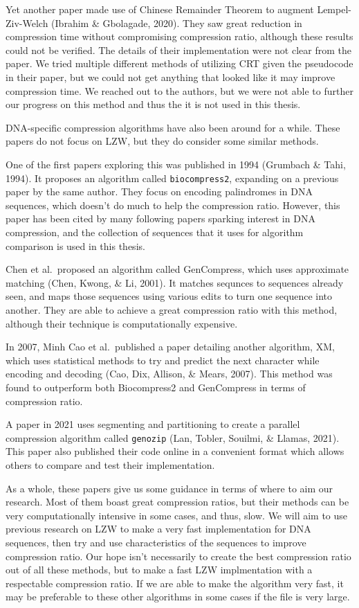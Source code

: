 \documentclass[12pt,twoside]{reedthesis}
\begin{document}
Yet another paper made use of Chinese Remainder Theorem to augment Lempel-Ziv-Welch (Ibrahim \& Gbolagade, 2020). They saw great reduction in compression time without compromising compression ratio, although these results could not be verified. The details of their implementation were not clear from the paper. We tried multiple different methods of utilizing CRT given the pseudocode in their paper, but we could not get anything that looked like it may improve compression time. We reached out to the authors, but we were not able to further our progress on this method and thus the it is not used in this thesis.

DNA-specific compression algorithms have also been around for a while. These papers do not focus on LZW, but they do consider some similar methods.

One of the first papers exploring this was published in 1994 (Grumbach \& Tahi, 1994). It proposes an algorithm called \texttt{biocompress2}, expanding on a previous paper by the same author. They focus on encoding palindromes in DNA sequences, which doesn't do much to help the compression ratio. However, this paper has been cited by many following papers sparking interest in DNA compression, and the collection of sequences that it uses for algorithm comparison is used in this thesis.

Chen et al.~proposed an algorithm called GenCompress, which uses approximate matching (Chen, Kwong, \& Li, 2001). It matches sequnces to sequences already seen, and maps those sequences using various edits to turn one sequence into another. They are able to achieve a great compression ratio with this method, although their technique is computationally expensive.

In 2007, Minh Cao et al.~published a paper detailing another algorithm, XM, which uses statistical methods to try and predict the next character while encoding and decoding (Cao, Dix, Allison, \& Mears, 2007). This method was found to outperform both Biocompress2 and GenCompress in terms of compression ratio.

A paper in 2021 uses segmenting and partitioning to create a parallel compression algorithm called \texttt{genozip} (Lan, Tobler, Souilmi, \& Llamas, 2021). This paper also published their code online in a convenient format which allows others to compare and test their implementation.

As a whole, these papers give us some guidance in terms of where to aim our research. Most of them boast great compression ratios, but their methods can be very computationally intensive in some cases, and thus, slow. We will aim to use previous research on LZW to make a very fast implementation for DNA sequences, then try and use characteristics of the sequences to improve compression ratio. Our hope isn't necessarily to create the best compression ratio out of all these methods, but to make a fast LZW implmentation with a respectable compression ratio. If we are able to make the algorithm very fast, it may be preferable to these other algorithms in some cases if the file is very large.
\end{document}
